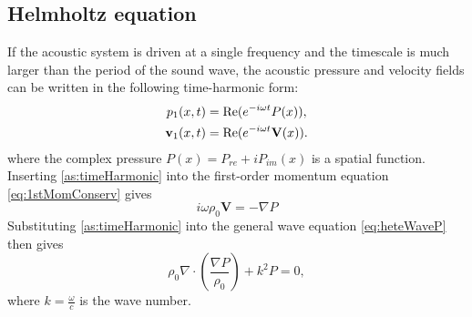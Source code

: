 \documentclass[final,num,12pt]{elsarticle}
\renewcommand{\v}{\TextOrMath{\textv}{\mathbf{v}}}
\newcommand{\V}{\mathbf{V}}
\begin{document}
\subsection{Helmholtz equation}
If the acoustic system is driven at a single frequency and the timescale is much larger than the period of the sound wave, the acoustic pressure and velocity fields can be written in the following time-harmonic form\cite{morse1986theoretical}:
\begin{equation}
    \begin{aligned}
        p_1(x,t) &= \mathrm{Re}(e^{-i\omega t}P(x)),\\
        \v_1(x,t) &= \mathrm{Re}(e^{-i\omega t}\V(x)).
    \end{aligned}
    \label{as:timeHarmonic}
\end{equation}
where the complex pressure $P(x)=P_{re}+ iP_{im}(x)$ is a spatial function.
Inserting \cref{as:timeHarmonic} into the first-order momentum equation \cref{eq:1stMomConserv} gives
\begin{equation}
    i\omega\rho_0 \V = -\nabla P
\end{equation}
Substituting \cref{as:timeHarmonic} into the general wave equation \cref{eq:heteWaveP} then gives
\begin{equation}
    \rho_0\nabla\cdot\left(\frac{\nabla P}{\rho_0}\right) + k^2P=0,
    \label{eq:heteHelmholtz}
\end{equation}
where $k=\frac{\omega}{c}$ is the wave number. 
\end{document}
